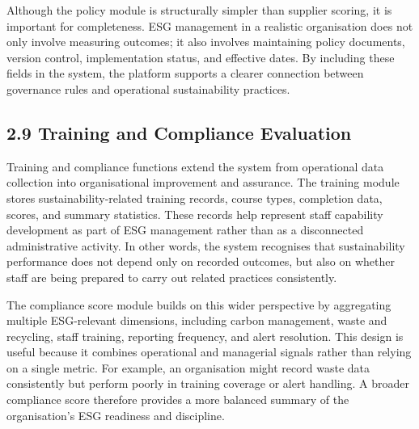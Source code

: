 \documentclass[10pt,a4paper]{article}
\begin{document}
Although the policy module is structurally simpler than supplier scoring, it is important for completeness. ESG management in a realistic organisation does not only involve measuring outcomes; it also involves maintaining policy documents, version control, implementation status, and effective dates. By including these fields in the system, the platform supports a clearer connection between governance rules and operational sustainability practices.

\subsection*{2.9 Training and Compliance Evaluation}
Training and compliance functions extend the system from operational data collection into organisational improvement and assurance. The training module stores sustainability-related training records, course types, completion data, scores, and summary statistics. These records help represent staff capability development as part of ESG management rather than as a disconnected administrative activity. In other words, the system recognises that sustainability performance does not depend only on recorded outcomes, but also on whether staff are being prepared to carry out related practices consistently.

The compliance score module builds on this wider perspective by aggregating multiple ESG-relevant dimensions, including carbon management, waste and recycling, staff training, reporting frequency, and alert resolution. This design is useful because it combines operational and managerial signals rather than relying on a single metric. For example, an organisation might record waste data consistently but perform poorly in training coverage or alert handling. A broader compliance score therefore provides a more balanced summary of the organisation's ESG readiness and discipline.
\end{document}
